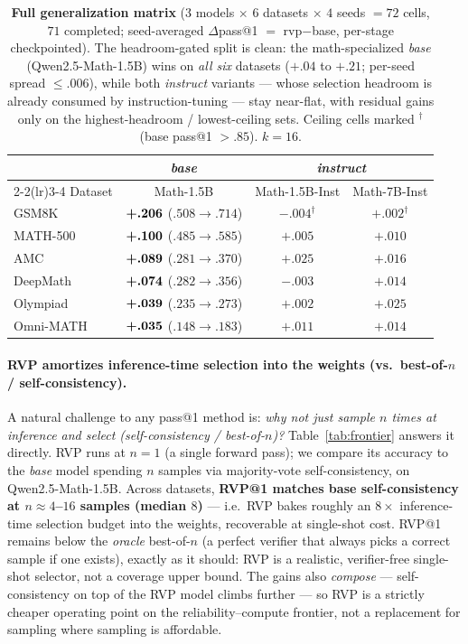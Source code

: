 \begin{table}[htbp]
\centering
\caption{\textbf{Full generalization matrix} ($3$ models $\times$ $6$ datasets $\times$ $4$ seeds
$=72$ cells, $71$ completed; seed-averaged $\Delta$pass@1 $=$ rvp$-$base, per-stage checkpointed).
The headroom-gated split is clean: the math-specialized \emph{base} (Qwen2.5-Math-1.5B) wins on
\emph{all six} datasets ($+.04$ to $+.21$; per-seed spread ${\le}.006$), while both \emph{instruct}
variants --- whose selection headroom is already consumed by instruction-tuning --- stay near-flat,
with residual gains only on the highest-headroom / lowest-ceiling sets. Ceiling cells marked
$^{\dagger}$ (base pass@1 ${>}.85$). $k{=}16$.}
\label{tab:final24}
\begin{tabular}{lccc}
\toprule
 & \multicolumn{1}{c}{\emph{base}} & \multicolumn{2}{c}{\emph{instruct}} \\
\cmidrule(lr){2-2}\cmidrule(lr){3-4}
Dataset & Math-1.5B & Math-1.5B-Inst & Math-7B-Inst \\
\midrule
GSM8K      & $\textbf{+.206}$ ($.508\!\to\!.714$) & $-.004^{\dagger}$ & $+.002^{\dagger}$ \\
MATH-500   & $\textbf{+.100}$ ($.485\!\to\!.585$) & $+.005$ & $+.010$ \\
AMC        & $\textbf{+.089}$ ($.281\!\to\!.370$) & $+.025$ & $+.016$ \\
DeepMath   & $\textbf{+.074}$ ($.282\!\to\!.356$) & $-.003$ & $+.014$ \\
Olympiad   & $\textbf{+.039}$ ($.235\!\to\!.273$) & $+.002$ & $+.025$ \\
Omni-MATH  & $\textbf{+.035}$ ($.148\!\to\!.183$) & $+.011$ & $+.014$ \\
\bottomrule
\end{tabular}
\end{table}

\paragraph{RVP amortizes inference-time selection into the weights (vs.\ best-of-$n$ / self-consistency).}
A natural challenge to any pass@1 method is: \emph{why not just sample $n$ times at inference and select
(self-consistency / best-of-$n$)?} Table~\ref{tab:frontier} answers it directly. RVP runs at $n{=}1$ (a
single forward pass); we compare its accuracy to the \emph{base} model spending $n$ samples via
majority-vote self-consistency, on Qwen2.5-Math-1.5B. Across datasets, \textbf{RVP@1 matches base
self-consistency at $n\approx4$--$16$ samples (median $8$)} --- i.e.\ RVP bakes roughly an $8\times$
inference-time selection budget into the weights, recoverable at single-shot cost. RVP@1 remains below
the \emph{oracle} best-of-$n$ (a perfect verifier that always picks a correct sample if one exists),
exactly as it should: RVP is a realistic, verifier-free single-shot selector, not a coverage upper bound.
The gains also \emph{compose} --- self-consistency on top of the RVP model climbs further --- so RVP is a
strictly cheaper operating point on the reliability--compute frontier, not a replacement for sampling
where sampling is affordable.

